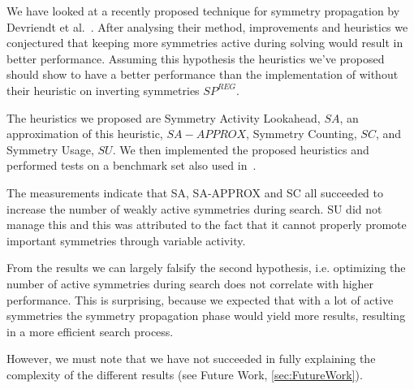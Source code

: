 We have looked at a recently proposed technique for symmetry propagation by Devriendt et al.~\cite{devriendt2012symmetry}.
After analysing their method, improvements and heuristics we conjectured that
keeping more symmetries active during solving would result in better performance.
Assuming this hypothesis the heuristics we've proposed should show to have a better performance than
the implementation of \cite{devriendt2012symmetry} without their heuristic on inverting symmetries
$SP^{REG}$.

The heuristics we proposed are Symmetry Activity Lookahead, $SA$, an approximation of this
heuristic, $SA-APPROX$, Symmetry Counting, $SC$, and Symmetry Usage, $SU$.
We then implemented the proposed heuristics and performed tests on a benchmark set also used
in~\cite{devriendt2012symmetry}.

The measurements indicate that SA, SA-APPROX and SC all succeeded to increase the number of weakly
active symmetries during search.
SU did not manage this and this was attributed to the fact that it cannot properly promote important
symmetries through variable activity.

From the results we can largely falsify the second hypothesis, i.e. optimizing the number of
active symmetries during search does not correlate with higher performance.
This is surprising, because we expected that with a lot of active symmetries the symmetry
propagation phase would yield more results, resulting in a more efficient search process.

However, we must note that we have not succeeded in fully explaining the complexity of the
different results (see Future Work, \cref{sec:FutureWork}).
